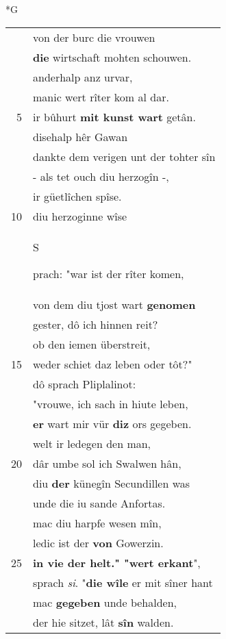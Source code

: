 \documentclass[8pt,a4paper,notitlepage]{article}
\begin{document}
\begin{table}[ht]
\begin{minipage}[t]{0.5\linewidth}
\small
\begin{center}*G
\end{center}
\begin{tabular}{rl}
 & von der burc die vrouwen\\ 
 & \textbf{die} wirtschaft mohten schouwen.\\ 
 & anderhalp anz urvar,\\ 
 & manic wert rîter kom al dar.\\ 
5 & ir bûhurt \textbf{mit kunst wart} getân.\\ 
 & disehalp hêr Gawan\\ 
 & dankte dem verigen unt der tohter sîn\\ 
 & - als tet ouch diu herzogîn -,\\ 
 & ir güetlîchen spîse.\\ 
10 & diu herzoginne wîse\\ 
 & \begin{large}S\end{large}prach: "war ist der rîter komen,\\ 
 & von dem diu tjost wart \textbf{genomen}\\ 
 & gester, dô ich hinnen reit?\\ 
 & ob den iemen überstreit,\\ 
15 & weder schiet daz leben oder tôt?"\\ 
 & dô sprach Pliplalinot:\\ 
 & "vrouwe, ich sach in hiute leben,\\ 
 & \textbf{er} wart mir vür \textbf{diz} ors gegeben.\\ 
 & welt ir ledegen den man,\\ 
20 & dâr umbe sol ich Swalwen hân,\\ 
 & diu \textbf{der} künegîn Secundillen was\\ 
 & unde die iu sande Anfortas.\\ 
 & mac diu harpfe wesen mîn,\\ 
 & ledic ist der \textbf{von} Gowerzin.\\ 
25 & \textbf{in vie der helt." "wert erkant}",\\ 
 & sprach \textit{si}. "\textbf{die wîle} er mit sîner hant\\ 
 & mac \textbf{gegeben} unde behalden,\\ 
 & der hie sitzet, lât \textbf{sîn} walden.\\ 

\end{tabular}
\end{minipage}
\end{table}
\end{document}
